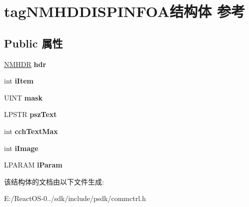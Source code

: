\hypertarget{structtag_n_m_h_d_d_i_s_p_i_n_f_o_a}{}\section{tag\+N\+M\+H\+D\+D\+I\+S\+P\+I\+N\+F\+O\+A结构体 参考}
\label{structtag_n_m_h_d_d_i_s_p_i_n_f_o_a}
\subsection*{Public 属性}
\begin{DoxyCompactItemize}
\item 
\mbox{\label{structtag_n_m_h_d_d_i_s_p_i_n_f_o_a_a7762b6947b47e7fcfb7f1d503ac67085}} 
\hyperlink{structtag_n_m_h_d_r}{N\+M\+H\+DR} {\bfseries hdr}
\item 
\mbox{\label{structtag_n_m_h_d_d_i_s_p_i_n_f_o_a_abbb2580ca9b2a9d1003835c9010c91bb}} 
int {\bfseries i\+Item}
\item 
\mbox{\label{structtag_n_m_h_d_d_i_s_p_i_n_f_o_a_a175a239bcb06b146c931f4eb735b2cb2}} 
U\+I\+NT {\bfseries mask}
\item 
\mbox{\label{structtag_n_m_h_d_d_i_s_p_i_n_f_o_a_ae79ae8d96f98f263dd45038cf92e642d}} 
L\+P\+S\+TR {\bfseries psz\+Text}
\item 
\mbox{\label{structtag_n_m_h_d_d_i_s_p_i_n_f_o_a_a9eb6926c9c76fbb990f299048da6915b}} 
int {\bfseries cch\+Text\+Max}
\item 
\mbox{\label{structtag_n_m_h_d_d_i_s_p_i_n_f_o_a_a70da2b40f79316ab0e7459c7328b6a2c}} 
int {\bfseries i\+Image}
\item 
\mbox{\label{structtag_n_m_h_d_d_i_s_p_i_n_f_o_a_ad5b1dcd2daed01074e258d9fff6b9f00}} 
L\+P\+A\+R\+AM {\bfseries l\+Param}
\end{DoxyCompactItemize}


该结构体的文档由以下文件生成\+:\begin{DoxyCompactItemize}
\item 
E\+:/\+React\+O\+S-\/0../sdk/include/psdk/commctrl.\+h\end{DoxyCompactItemize}
